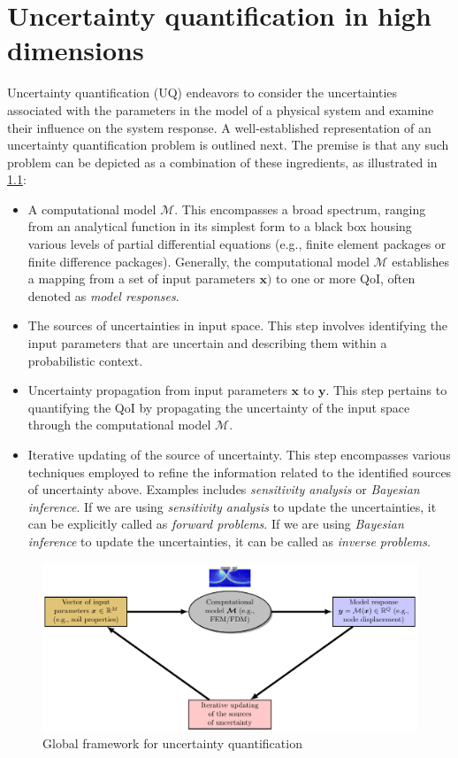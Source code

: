 \chapter{Uncertainty quantification in high dimensions}
\label{UQ}

Uncertainty quantification (UQ) endeavors to consider the uncertainties associated with the parameters in the model of a physical system and examine their influence on the system response. A well-established representation of an uncertainty quantification problem is outlined next. The premise is that any such problem can be depicted as a combination of these ingredients, as illustrated in \cref{fig: UQ_steps}:
\begin{itemize}
    \item A computational model $\mathcal{M}$. This encompasses a broad spectrum, ranging from an analytical function in its simplest form to a black box housing various levels of partial differential equations (e.g., finite element packages or finite difference packages). Generally, the computational model $\mathcal{M}$ establishes a mapping from a set of input parameters $\boldsymbol{x})$ to one or more \acrfull{QoI}, often denoted as \textit{model responses}.    
    \item The sources of uncertainties in input space. This step involves identifying the input parameters that are uncertain and describing them within a probabilistic context.
    \item Uncertainty propagation from input parameters $\boldsymbol{x}$ to $\boldsymbol{y}$. This step pertains to quantifying the \acrshort{QoI} by propagating the uncertainty of the input space through the computational model $\mathcal{M}$. 
    \item Iterative updating of the source of uncertainty. This step encompasses various techniques employed to refine the information related to the identified sources of uncertainty above. Examples includes \textit{sensitivity analysis} or \textit{Bayesian inference}. If we are using \textit{sensitivity analysis} to update the uncertainties, it can be explicitly called as \textit{forward problems}. If we are using \textit{Bayesian inference} to update the uncertainties, it can be called as \textit{inverse problems}.
\end{itemize}
\begin{figure}[htbp]
    \centering
    \includegraphics[width = 140mm]{Figures/figure-UQ_steps.pdf}
    \caption{Global framework for uncertainty quantification}
    \label{fig: UQ_steps}
\end{figure}


